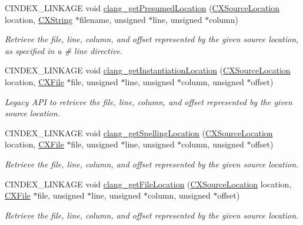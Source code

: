 \begin{DoxyCompactItemize}
C\+I\+N\+D\+E\+X\+\_\+\+L\+I\+N\+K\+A\+GE void \mbox{\hyperlink{group__CINDEX__LOCATIONS_ga03508d9c944feeb3877515a1b08d36f9}{clang\+\_\+get\+Presumed\+Location}} (\mbox{\hyperlink{structCXSourceLocation}{C\+X\+Source\+Location}} location, \mbox{\hyperlink{structCXString}{C\+X\+String}} $\ast$filename, unsigned $\ast$line, unsigned $\ast$column)
\begin{DoxyCompactList}\small\item\em Retrieve the file, line, column, and offset represented by the given source location, as specified in a \# line directive. \end{DoxyCompactList}\item 
C\+I\+N\+D\+E\+X\+\_\+\+L\+I\+N\+K\+A\+GE void \mbox{\hyperlink{group__CINDEX__LOCATIONS_ga112e657eb04c281ca12c6975d489b633}{clang\+\_\+get\+Instantiation\+Location}} (\mbox{\hyperlink{structCXSourceLocation}{C\+X\+Source\+Location}} location, \mbox{\hyperlink{group__CINDEX__FILES_gacfcea9c1239c916597e2e5b3e109215a}{C\+X\+File}} $\ast$file, unsigned $\ast$line, unsigned $\ast$column, unsigned $\ast$offset)
\begin{DoxyCompactList}\small\item\em Legacy A\+PI to retrieve the file, line, column, and offset represented by the given source location. \end{DoxyCompactList}\item 
C\+I\+N\+D\+E\+X\+\_\+\+L\+I\+N\+K\+A\+GE void \mbox{\hyperlink{group__CINDEX__LOCATIONS_ga01f1a342f7807ea742aedd2c61c46fa0}{clang\+\_\+get\+Spelling\+Location}} (\mbox{\hyperlink{structCXSourceLocation}{C\+X\+Source\+Location}} location, \mbox{\hyperlink{group__CINDEX__FILES_gacfcea9c1239c916597e2e5b3e109215a}{C\+X\+File}} $\ast$file, unsigned $\ast$line, unsigned $\ast$column, unsigned $\ast$offset)
\begin{DoxyCompactList}\small\item\em Retrieve the file, line, column, and offset represented by the given source location. \end{DoxyCompactList}\item 
C\+I\+N\+D\+E\+X\+\_\+\+L\+I\+N\+K\+A\+GE void \mbox{\hyperlink{group__CINDEX__LOCATIONS_gae0ee9ff0ea04f2446832fc12a7fd2ac8}{clang\+\_\+get\+File\+Location}} (\mbox{\hyperlink{structCXSourceLocation}{C\+X\+Source\+Location}} location, \mbox{\hyperlink{group__CINDEX__FILES_gacfcea9c1239c916597e2e5b3e109215a}{C\+X\+File}} $\ast$file, unsigned $\ast$line, unsigned $\ast$column, unsigned $\ast$offset)
\begin{DoxyCompactList}\small\item\em Retrieve the file, line, column, and offset represented by the given source location. \end{DoxyCompactList}\item 

\end{DoxyCompactItemize}
